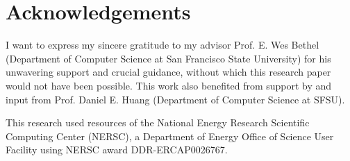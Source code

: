 \section*{Acknowledgements}
\label{sec:acknowledgements}

I want to express my sincere gratitude to my advisor Prof. E. Wes Bethel (Department of Computer Science at San Francisco State University) for his unwavering support and crucial guidance, without which this research paper would not have been possible.
This work also benefited from support by and input from Prof. Daniel E. Huang (Department of Computer Science at SFSU).

This research used resources of the National Energy Research Scientific Computing Center (NERSC), a Department of Energy Office of Science User Facility using NERSC award DDR-ERCAP0026767.